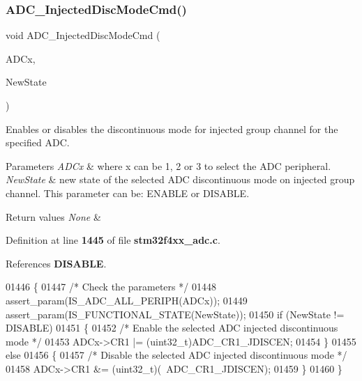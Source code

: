 \subsubsection{A\+D\+C\+\_\+\+Injected\+Disc\+Mode\+Cmd()}
{\footnotesize\ttfamily void A\+D\+C\+\_\+\+Injected\+Disc\+Mode\+Cmd (\begin{DoxyParamCaption}\item[{\textbf{ A\+D\+C\+\_\+\+Type\+Def} $\ast$}]{A\+D\+Cx,  }\item[{\textbf{ Functional\+State}}]{New\+State }\end{DoxyParamCaption})}



Enables or disables the discontinuous mode for injected group channel for the specified A\+DC. 


\begin{DoxyParams}{Parameters}
{\em A\+D\+Cx} & where x can be 1, 2 or 3 to select the A\+DC peripheral. \\
\hline
{\em New\+State} & new state of the selected A\+DC discontinuous mode on injected group channel. This parameter can be\+: E\+N\+A\+B\+LE or D\+I\+S\+A\+B\+LE. \\
\hline
\end{DoxyParams}

\begin{DoxyRetVals}{Return values}
{\em None} & \\
\hline
\end{DoxyRetVals}


Definition at line \textbf{ 1445} of file \textbf{ stm32f4xx\+\_\+adc.\+c}.



References \textbf{ D\+I\+S\+A\+B\+LE}.


\begin{DoxyCode}
01446 \{
01447   \textcolor{comment}{/* Check the parameters */}
01448   assert_param(IS_ADC_ALL_PERIPH(ADCx));
01449   assert_param(IS_FUNCTIONAL_STATE(NewState));
01450   \textcolor{keywordflow}{if} (NewState != DISABLE)
01451   \{
01452     \textcolor{comment}{/* Enable the selected ADC injected discontinuous mode */}
01453     ADCx->CR1 |= (uint32\_t)ADC_CR1_JDISCEN;
01454   \}
01455   \textcolor{keywordflow}{else}
01456   \{
01457     \textcolor{comment}{/* Disable the selected ADC injected discontinuous mode */}
01458     ADCx->CR1 &= (uint32\_t)(~ADC_CR1_JDISCEN);
01459   \}
01460 \}
\end{DoxyCode}
\mbox{\label{group__ADC__Group6_ga24eba90bc3ee955e07659a605011710d}} 
